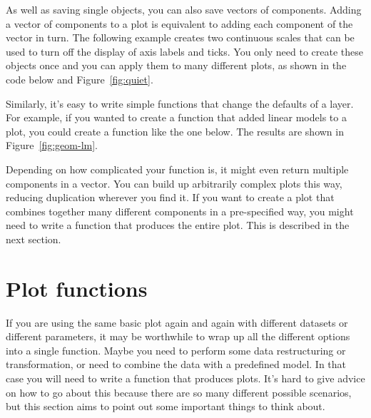 As well as saving single objects, you can also save vectors of \ggplot components. Adding a vector of components to a plot is equivalent to adding each component of the vector in turn. The following example creates two continuous scales that can be used to turn off the display of axis labels and ticks. You only need to create these objects once and you can apply them to many different plots, as shown in the code below and Figure~\ref{fig:quiet}. 

% 
% 


Similarly, it's easy to write simple functions that change the defaults of a layer. For example, if you wanted to create a function that added linear models to a plot, you could create a function like the one below. The results are shown in Figure~\ref{fig:geom-lm}.

% 


Depending on how complicated your function is, it might even return multiple components in a vector. You can build up arbitrarily complex plots this way, reducing duplication wherever you find it.  If you want to create a plot that combines together many different components in a pre-specified way, you might need to write a function that produces the entire plot. This is described in the next section.

\section{Plot functions}
\label{sec:functions}

If you are using the same basic plot again and again with different datasets or different parameters, it may be worthwhile to wrap up all the different options into a single function. Maybe you need to perform some data restructuring or transformation, or need to combine the data with a predefined model. In that case you will need to write a function that produces \ggplot plots. It's hard to give advice on how to go about this because there are so many different possible scenarios, but this section aims to point out some important things to think about.  

